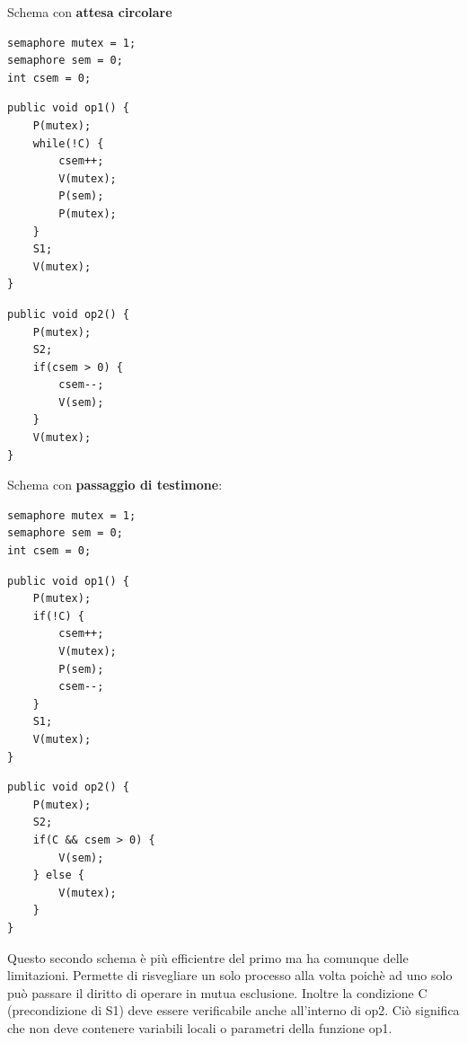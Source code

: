 \documentclass{article}
\begin{document}
\vspace{3mm}
Schema con \textbf{attesa circolare}

\begin{lstlisting}
semaphore mutex = 1;
semaphore sem = 0;
int csem = 0;
\end{lstlisting}

\noindent\begin{minipage}{.45\columnwidth}
    \begin{lstlisting}
public void op1() {
    P(mutex);
    while(!C) {
        csem++;
        V(mutex);
        P(sem);
        P(mutex);
    }
    S1;
    V(mutex);
}
    \end{lstlisting}
\end{minipage}\hfill
\begin{minipage}{.45\columnwidth}
    \begin{lstlisting}
public void op2() {
    P(mutex);
    S2;
    if(csem > 0) {
        csem--;
        V(sem);
    }
    V(mutex);
}
    \end{lstlisting}
\end{minipage}

\vspace{3mm}
Schema con \textbf{passaggio di testimone}:

\begin{lstlisting}
semaphore mutex = 1;
semaphore sem = 0;
int csem = 0;
\end{lstlisting}

\noindent\begin{minipage}{.45\columnwidth}
    \begin{lstlisting}
public void op1() {
    P(mutex);
    if(!C) {
        csem++;
        V(mutex);
        P(sem);
        csem--;
    }
    S1;
    V(mutex);
}
    \end{lstlisting}
\end{minipage}\hfill
\begin{minipage}{.45\columnwidth}
    \begin{lstlisting}
public void op2() {
    P(mutex);
    S2;
    if(C && csem > 0) {
        V(sem);
    } else {
        V(mutex);
    }
}
    \end{lstlisting}
\end{minipage}

\vspace{3mm}
Questo secondo schema è più efficientre del primo ma ha comunque delle limitazioni. Permette di risvegliare un solo processo alla volta poichè ad uno solo può passare
il diritto di operare in mutua esclusione. Inoltre la condizione C (precondizione di S1) deve essere verificabile anche all'interno di op2. Ciò significa che
non deve contenere variabili locali o parametri della funzione op1.
\end{document}
